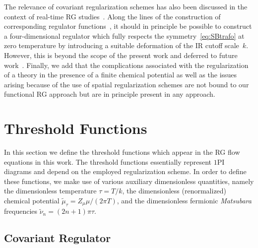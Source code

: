 \documentclass[prd,english,preprintnumbers,amsmath,amssymb,nofootinbib,twocolumn,superscriptaddress]{revtex4-1}
\begin{document}
{{{The relevance of covariant regularization schemes has also been discussed in the
context of real-time RG studies~\cite{Floerchinger:2011sc,Pawlowski:2015mia,Strodthoff:2016pxx}.
Along the 
lines of the construction of corresponding regulator functions~\cite{Pawlowski:2015mia},
it should in principle be
possible to construct a four-dimensional regulator} which fully respects the symmetry~\eqref{eq:SBtrafo} at zero temperature by
introducing a suitable deformation of the IR cutoff scale~$k$. However, this is beyond the scope of the present
work and deferred to future work~\cite{BraunLeonhPawlo}. 
Finally, we add that the complications
associated with the regularization of a theory in the presence of a finite chemical potential as well as the issues arising
because of the use of spatial regularization schemes are not bound to our functional RG approach but are in principle 
present in any approach.

%
\section{Threshold Functions}\label{app:RGtf}
%
In this section we define the threshold functions which appear in the RG flow equations in this work. 
The threshold functions essentially represent $1$PI diagrams and depend on the employed regularization scheme. In order to define these functions, 
we make use of various auxiliary dimensionless quantities, namely the dimensionless temperature $\tau = T/k$, the dimensionless (renormalized) 
chemical potential $\tilde \mu_{\tau} =  Z_{\mu}\mu / (2\pi T) $, and the dimensionless fermionic {\it Matsubara} frequencies $\tilde \nu _n = (2n+1) \pi \tau$. 

%
\subsection{Covariant Regulator}
%

}}
\end{document}
